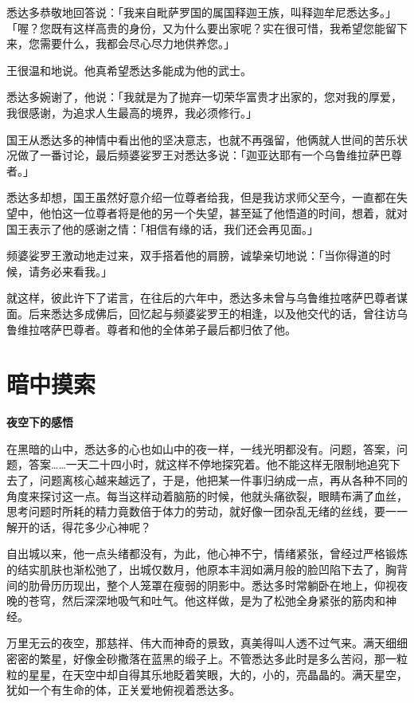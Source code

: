 \documentclass[twoside,openany]{book}
\newcommand{\mt}[1]{\textbullet \textbf{#1}}
\begin{document}
悉达多恭敬地回答说：「我来自毗萨罗国的属国释迦王族，叫释迦牟尼\textperiodcentered 悉达多。」「喔？您既有这样高贵的身份，又为什么要出家呢？实在很可惜，我希望您能留下来，您需要什么，我都会尽心尽力地供养您。」

王很温和地说。他真希望悉达多能成为他的武士。

悉达多婉谢了，他说：「我就是为了抛弃一切荣华富贵才出家的，您对我的厚爱，我很感谢，为追求人生最高的境界，我必须修行。」

国王从悉达多的神情中看出他的坚决意志，也就不再强留，他俩就人世间的苦乐状况做了一番讨论，最后频婆娑罗王对悉达多说：「迦亚达耶有一个乌鲁维拉萨巴尊者。」

悉达多却想，国王虽然好意介绍一位尊者给我，但是我访求师父至今，一直都在失望中，他怕这一位尊者将是他的另一个失望，甚至延了他悟道的时间，想着，就对国王表示了他的感谢之情：「相信有缘的话，我们还会再见面。」

频婆娑罗王激动地走过来，双手搭着他的肩膀，诚挚亲切地说：「当你得道的时候，请务必来看我。」

就这样，彼此许下了诺言，在往后的六年中，悉达多未曾与乌鲁维拉喀萨巴尊者谋面。后来悉达多成佛后，回忆起与频婆娑罗王的相逢，以及他交代的话，曾往访乌鲁维拉喀萨巴尊者。尊者和他的全体弟子最后都归依了他。

\section{暗中摸索}\label{sec1.7}

\mt{夜空下的感悟}

在黑暗的山中，悉达多的心也如山中的夜一样，一线光明都没有。问题，答案，问题，答案……一天二十四小时，就这样不停地探究着。他不能这样无限制地追究下去了，问题离核心越来越远了，于是，他把某一件事归纳成一点，再从各种不同的角度来探讨这一点。每当这样动着脑筋的时候，他就头痛欲裂，眼睛布满了血丝，思考问题时所耗的精力竟数倍于体力的劳动，就好像一团杂乱无绪的丝线，要一一解开的话，得花多少心神呢？

自出城以来，他一点头绪都没有，为此，他心神不宁，情绪紧张，曾经过严格锻炼的结实肌肤也渐松弛了，出城仅数月，他原本丰润如满月般的脸凹陷下去了，胸背间的肋骨历历现出，整个人笼罩在瘦弱的阴影中。悉达多时常躺卧在地上，仰视夜晚的苍穹，然后深深地吸气和吐气。他这样做，是为了松弛全身紧张的筋肉和神经。

万里无云的夜空，那慈祥、伟大而神奇的景致，真美得叫人透不过气来。满天细细密密的繁星，好像金砂撒落在蓝黑的缎子上。不管悉达多此时是多么苦闷，那一粒粒的星星，在天空中却自得其乐地眨着笑眼，大的，小的，亮晶晶的。满天星空，犹如一个有生命的体，正关爱地俯视着悉达多。
\end{document}
